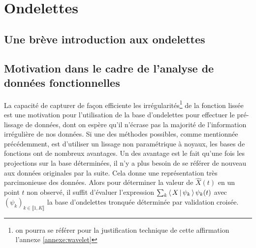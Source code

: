 

\section{Ondelettes}
\subsection{Une brève introduction aux ondelettes}




\subsection{Motivation dans le cadre de l'analyse de données fonctionnelles}

La capacité de capturer de façon efficiente les irrégularités\footnote{on pourra se référer pour la justification technique de cette affirmation l'annexe \ref{annexe:wavelet}} de la fonction lissée est une motivation pour l'utilisation de la base d'ondelettes pour effectuer le pré-lissage de données, dont on espère qu'il n'écrase pas la majorité de l'information irrégulière de nos données. Si une des méthodes possibles, comme mentionnée précédemment, est d'utiliser un lissage non paramétrique à noyaux, les bases de fonctions ont de nombreux avantages. Un des avantage est le fait qu'une fois les projections sur la base déterminées, il n'y a plus besoin de se référer de nouveau aux données originales par la suite. Cela donne une représentation très parcimonieuse des données. Alors pour déterminer la valeur de $\widehat X(t)$ en un point $t$ non observé, il suffit d'évaluer l'expression $\sum_k \left\langle \, X \, \vert \, \psi_k \, \right\rangle \psi_k(t)$ avec $(\psi_k)_{k \in \llbracket 1, K \rrbracket}$ la base d'ondelettes tronquée déterminée par validation croisée.
